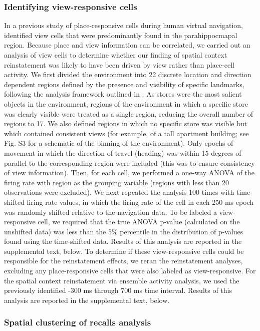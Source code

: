 \subsubsection*{Identifying view-responsive cells}
In a previous study of  place-responsive cells during human virtual navigation, \cite{EkstEtal03} identified view cells that were predominantly found in the parahippocmapal region.  Because place and view information can be correlated, we carried out an analysis of view cells to determine whether our finding of spatial context reinstatement was likely to have been driven by view rather than place-cell activity.  We first divided the environment into 22 discrete location and direction dependent regions defined by the presence and visibility of specific landmarks, following the analysis framework outlined in \cite{EkstEtal03}. As stores were the most salient objects in the environment, regions of the environment in which a specific store was clearly visible were treated as a single region, reducing the overall number of regions to 17. We also defined regions  in which no specific store was visible but which contained consistent views (for example, of a tall apartment building; see Fig. S3 for a schematic of the binning of the environment).  Only epochs of movement in which the direction of travel (heading) was within 15 degrees of parallel to the corresponding region were included (this was to ensure consistency of view information).  Then, for each cell, we performed a one-way ANOVA of the firing rate with region as the grouping variable (regions with less than 20 observations were excluded). We next repeated the analysis 100 times with time-shifted firing rate values, in which the firing rate of the cell in each 250 ms epoch was randomly shifted relative to the navigation data.  To be labeled a view-responsive cell, we required that the true ANOVA p-value (calculated on the unshifted data) was less than the 5\% percentile in the distribution of p-values found using the time-shifted data.  Results of this analysis are reported in the supplemental text, below.  To determine if these view-responsive cells could be responsible for the reinstatement effects, we reran the reinstatement analyses, excluding any place-responsive cells that were also labeled as view-responsive. For the spatial context reinstatement via ensemble activity analysis, we used the previously identified -300 ms through 700 ms time interval.  Results of this analysis are reported in the supplemental text, below.

\subsubsection*{Spatial clustering of recalls analysis}


